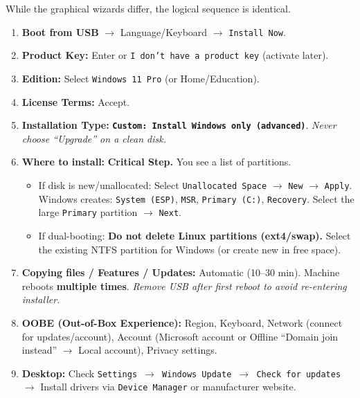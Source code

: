 \documentclass[11pt]{article}
\begin{document}
While the graphical wizards differ, the logical sequence is identical.

\begin{experience}
\begin{enumerate}
    \item \textbf{Boot from USB} $\rightarrow$ Language/Keyboard $\rightarrow$ \texttt{Install Now}.
    \item \textbf{Product Key:} Enter or \texttt{I don't have a product key} (activate later).
    \item \textbf{Edition:} Select \texttt{Windows 11 Pro} (or Home/Education).
    \item \textbf{License Terms:} Accept.
    \item \textbf{Installation Type:} \textbf{\texttt{Custom: Install Windows only (advanced)}}. \emph{Never choose ``Upgrade'' on a clean disk.}
    \item \textbf{Where to install:} \textbf{Critical Step.} You see a list of partitions.
        \begin{itemize}
            \item If disk is new/unallocated: Select \texttt{Unallocated Space} $\rightarrow$ \texttt{New} $\rightarrow$ \texttt{Apply}. Windows creates: \texttt{System (ESP)}, \texttt{MSR}, \texttt{Primary (C:)}, \texttt{Recovery}. Select the large \texttt{Primary} partition $\rightarrow$ \texttt{Next}.
            \item If dual-booting: \textbf{Do not delete Linux partitions (ext4/swap).} Select the existing NTFS partition for Windows (or create new in free space).
        \end{itemize}
    \item \textbf{Copying files / Features / Updates:} Automatic (10--30 min). Machine reboots \textbf{multiple times}. \emph{Remove USB after first reboot to avoid re-entering installer.}
    \item \textbf{OOBE (Out-of-Box Experience):} Region, Keyboard, Network (connect for updates/account), Account (Microsoft account or Offline ``Domain join instead'' $\rightarrow$ Local account), Privacy settings.
    \item \textbf{Desktop:} Check \texttt{Settings $\rightarrow$ Windows Update $\rightarrow$ Check for updates} $\rightarrow$ Install drivers via \texttt{Device Manager} or manufacturer website.
\end{enumerate}
\end{experience}
\end{document}
